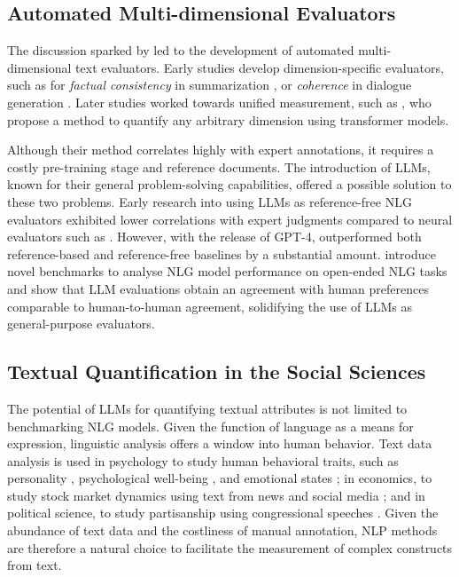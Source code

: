 \subsection{Automated Multi-dimensional Evaluators}

The discussion sparked by \citet{fabbri_summeval_2021} led to the development of automated multi-dimensional text evaluators. Early studies develop dimension-specific evaluators, such as for \textit{factual consistency} in summarization \citep{kryscinskiEvaluatingFactualConsistency2020, wangAskingAnsweringQuestions2020}, or \textit{coherence} in dialogue generation \citep{dziriEvaluatingCoherenceDialogue2019, yeQuantifiableDialogueCoherence2021}. Later studies worked towards unified measurement, such as \citet{zhong_towards_2022}, who propose a method to quantify any arbitrary dimension using transformer models. 

Although their method correlates highly with expert annotations, it requires a costly pre-training stage and reference documents. The introduction of LLMs, known for their general problem-solving capabilities, offered a possible solution to these two problems. Early research into using LLMs as reference-free NLG evaluators \citep{fuGPTScoreEvaluateYou2023, wangChatGPTGoodNLG2023} exhibited lower correlations with expert judgments compared to neural evaluators such as \citet{zhong_towards_2022}. However, with the release of GPT-4, \citet{liu_g-eval_2023} outperformed both reference-based and reference-free baselines by a substantial amount. \citet{zheng_judging_2023} introduce novel benchmarks to analyse NLG model performance on open-ended NLG tasks and show that LLM evaluations obtain an agreement with human preferences comparable to human-to-human agreement, solidifying the use of LLMs as general-purpose evaluators. 

\subsection{Textual Quantification in the Social Sciences}

The potential of LLMs for quantifying textual attributes is not limited to benchmarking NLG models. Given the function of language as a means for expression, linguistic analysis offers a window into human behavior. Text data analysis is used in psychology to study human behavioral traits, such as personality \citep{boydLanguagebasedPersonalityNew2017}, psychological well-being \citep{guntukuDetectingDepressionMental2017}, and emotional states \citep{kahnMeasuringEmotionalExpression2007}; in economics, to study stock market dynamics using text from news and social media \citep{manelaNewsImpliedVolatility2017}; and in political science, to study partisanship using congressional speeches \citep{gentzkowMeasuringGroupDifferences2019}. Given the abundance of text data and the costliness of manual annotation, NLP methods are therefore a natural choice to facilitate the measurement of complex constructs from text. 

